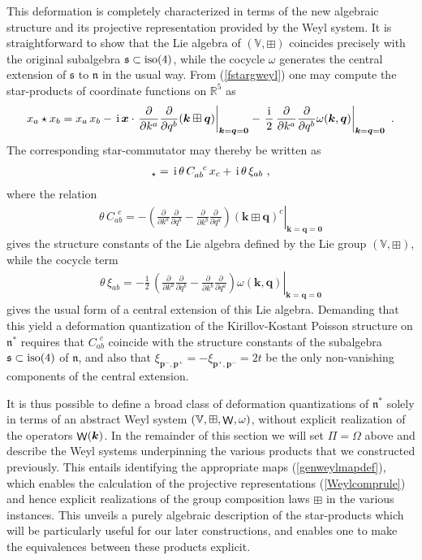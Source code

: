 \documentclass[11pt,a4paper]{article}
\DeclareMathOperator{\weyl}{{\sf W}}                   %
\newcommand{\comp}{\boxplus}                            %
\newcommand{\mbf}[1]{{\boldsymbol {#1} }}
\def\ii{{\,{\rm i}\,}}
\def\mx{{\mbf x}}
\def\mk{{\mbf k}}
\def\mq{{\mbf q}}
\def\mbp{{\mbf p}}
\def\mfn{{\mathfrak n}}
\def\mfs{{\mathfrak s}}
\def\mbbV{{\mathbb V}}
\newcommand{\real}{{\mathbb R}} %
\def\d{\partial}
\newcommand{\beq}{\begin{eqnarray}}
\newcommand{\eeq}{\end{eqnarray}}
\begin{document}
This deformation is completely characterized in terms of the
new algebraic structure and its projective representation provided by
the Weyl system. It is straightforward to show
that the Lie algebra of $(\mathbb{V},\comp)$ coincides precisely with
the original subalgebra $\mfs\subset{\rm iso}(4)$, while the cocycle $\omega$
generates the central extension of $\mfs$ to $\mfn$ in the
usual way. From (\ref{fstargweyl}) one may compute the
star-products of coordinate functions on $\real^5$ as
\beq
x_a\star x_b=x_a\,x_b-\ii\mx\cdot\left.\frac\d{\d k^a}\frac\d
{\d q^b}(\mk\comp\mq)\right|_{\mk=\mq=\mbf0}-\left.\frac\ii2\,
\frac\d{\d k^a}\frac\d
{\d q^b}\omega(\mk,\mq)\right|_{\mk=\mq=\mbf0} \ .
\label{xastarxbweyl}\eeq
The corresponding star-commutator may thereby be written as
\beq
[x_a,x_b]_\star=\ii\theta\,C_{ab}^{~~c}\,x_c+\ii\theta\,\xi_{ab} \ ,
\label{xaxbstarcommxi}\eeq
where the relation
\beq
\theta\,C_{ab}^{~~c}=-\left.\left(\frac\d{\d k^a}\frac\d
{\d q^b}-\frac\d{\d k^b}\frac\d
{\d q^a}\right)(\mk\comp\mq)^c\right|_{\mk=\mq=\mbf0}
\label{Cabccomp}\eeq
gives the structure constants of the Lie algebra defined by the Lie
group $(\mathbb{V},\comp)$, while the cocycle term
\beq
\theta\,\xi_{ab}=-\frac12\,\left.\left(\frac\d{\d k^a}\frac\d
{\d q^b}-\frac\d{\d k^b}\frac\d
{\d q^a}\right)\omega(\mk,\mq)\right|_{\mk=\mq=\mbf0}
\label{cocycleterm}\eeq
gives the usual form of a central extension of this Lie
algebra. Demanding that this yield a deformation quantization of the
Kirillov-Kostant Poisson structure on $\mfn^*$ requires that
$C_{ab}^{~~c}$ coincide with the structure constants of the subalgebra
$\mfs\subset{\rm iso}(4)$ of $\mfn$, and also that
$\xi_{\mbp^-,\mbp^+}=-\xi_{\mbp^+,\mbp^-}=2t$ be the only
non-vanishing components of the central extension.

It is thus possible to define a broad class of deformation quantizations of
$\mfn^*$ solely in terms of an abstract Weyl system
$(\mbbV,\comp,\weyl,\omega)$, without explicit realization of the
operators $\weyl(\mk)$. In the remainder of this section we will
set $\Pi=\Omega$ above and describe the Weyl systems
underpinning the various products that we constructed previously. This
entails identifying the appropriate maps (\ref{genweylmapdef}), which
enables the calculation of the projective representations
(\ref{Weylcomprule}) and hence explicit realizations of the group
composition laws $\comp$ in the various instances. This unveils a
purely algebraic description of the star-products which will be
particularly useful for our later constructions, and enables one to
make the equivalences between these products explicit.
\end{document}

